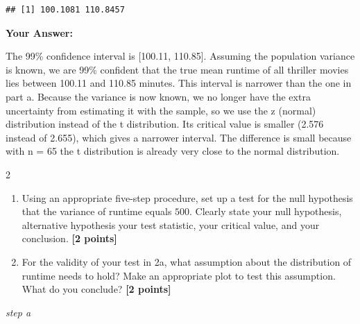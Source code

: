 \documentclass[
]{article}
\providecommand{\tightlist}{%
  \setlength{\itemsep}{0pt}\setlength{\parskip}{0pt}}
\begin{document}
\begin{verbatim}
## [1] 100.1081 110.8457
\end{verbatim}

\textbf{Your Answer:}

The 99\% confidence interval is {[}100.11, 110.85{]}. Assuming the
population variance is known, we are 99\% confident that the true mean
runtime of all thriller movies lies between 100.11 and 110.85 minutes.
This interval is narrower than the one in part a. Because the variance
is now known, we no longer have the extra uncertainty from estimating it
with the sample, so we use the z (normal) distribution instead of the t
distribution. Its critical value is smaller (2.576 instead of 2.655),
which gives a narrower interval. The difference is small because with n
= 65 the t distribution is already very close to the normal
distribution.

2

\begin{enumerate}
\def\labelenumi{\alph{enumi}.}
\tightlist
\item
  Using an appropriate five-step procedure, set up a test for the null
  hypothesis that the variance of runtime equals \(500\). Clearly state
  your null hypothesis, alternative hypothesis your test statistic, your
  critical value, and your conclusion. \textbf{[2 points]}
\item
  For the validity of your test in 2a, what assumption about the
  distribution of runtime needs to hold? Make an appropriate plot to
  test this assumption. What do you conclude? \textbf{[2 points]}
\end{enumerate}

\emph{step a}
\end{document}
